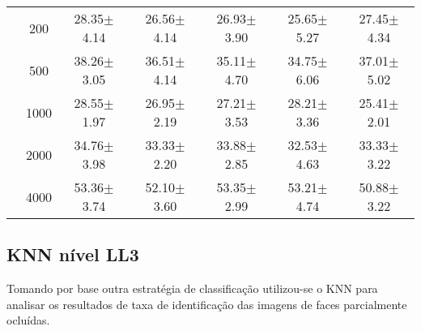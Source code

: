 \begin{table}[H]
\begin{tabular}{|c|c|c c c c c|}
\multicolumn{1}{|c|}{ \multirow{5}{*}{\rotatebox[origin=c]{90}{\textbf{Neurônios}}} }
&200	&28.35$\pm$4.14	&26.56$\pm$4.14	&26.93$\pm$3.90	&25.65$\pm$5.27	&27.45$\pm$4.34	\\\cline{2-7}
&500	&38.26$\pm$3.05	&36.51$\pm$4.14	&35.11$\pm$4.70 &34.75$\pm$6.06 &37.01$\pm$5.02	\\\cline{2-7}
&1000	&28.55$\pm$1.97	&26.95$\pm$2.19	&27.21$\pm$3.53	&28.21$\pm$3.36	&25.41$\pm$2.01	\\\cline{2-7}
&2000	&34.76$\pm$3.98	&33.33$\pm$2.20	&33.88$\pm$2.85	&32.53$\pm$4.63	&33.33$\pm$3.22	\\\cline{2-7}
&4000	&53.36$\pm$3.74	&52.10$\pm$3.60	&53.35$\pm$2.99	&53.21$\pm$4.74	&50.88$\pm$3.22	

\\\midrule
	\end{tabular}

\end{table}

\subsection{KNN nível LL3}


Tomando por base outra estratégia de classificação utilizou-se o KNN para analisar os resultados de taxa de identificação das imagens de faces parcialmente ocluídas.


